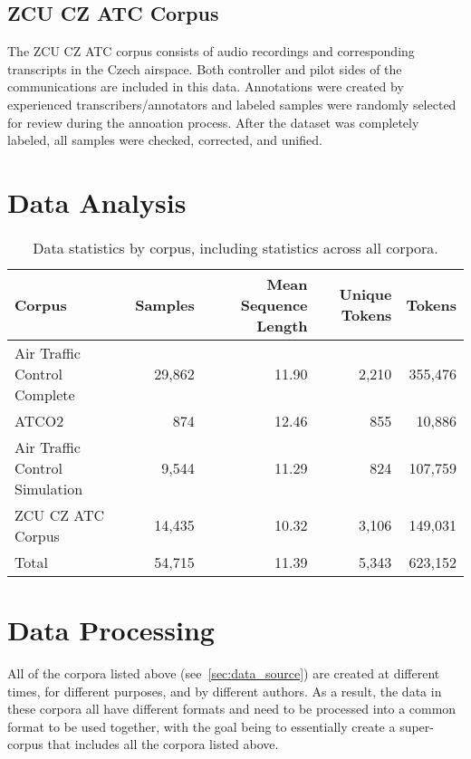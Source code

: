 \documentclass[12pt]{article}
\begin{document}
\subsection{ZCU CZ ATC Corpus}
The ZCU CZ ATC corpus consists of audio recordings and corresponding transcripts in the Czech airspace. Both controller and pilot sides of the
communications are included in this data. Annotations were created by experienced transcribers/annotators and labeled samples were randomly selected
for review during the annoation process. After the dataset was completely labeled, all samples were checked, corrected, and
unified\cite{smidl_air_2019}.

\section{Data Analysis}
\begin{table}
    \centering
    \begin{tabular}{l r r r r}
        Corpus                         & Samples & Mean Sequence Length & Unique Tokens & Tokens  \\
        \toprule
        Air Traffic Control Complete   & 29,862  & 11.90                & 2,210         & 355,476 \\
        ATCO2                          & 874     & 12.46                & 855           & 10,886  \\
        Air Traffic Control Simulation & 9,544   & 11.29                & 824           & 107,759 \\
        ZCU CZ ATC Corpus              & 14,435  & 10.32                & 3,106         & 149,031 \\
        \bottomrule
        Total                          & 54,715  & 11.39                & 5,343         & 623,152 \\
    \end{tabular}
    \caption{Data statistics by corpus, including statistics across all corpora.}
\end{table}

\section{Data Processing}
All of the corpora listed above (see~\ref{sec:data_source}) are created at different times, for different purposes, and by different authors.
As a result, the data in these corpora all have different formats and need to be processed into a common format to be used together, with the goal
being to essentially create a super-corpus that includes all the corpora listed above.
\end{document}
